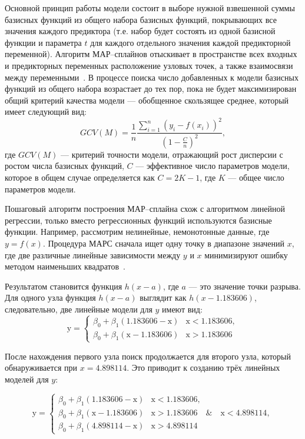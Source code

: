 Основной принцип работы модели состоит в выборе нужной взвешенной суммы базисных функций из общего набора базисных функций, покрывающих все значения каждого предиктора (т.е. набор будет состоять из одной базисной функции и параметра $t$ для каждого отдельного значения каждой предикторной переменной).
Алгоритм МАР--сплайнов отыскивает в пространстве всех входных и предикторных переменных расположение узловых точек, а также взаимосвязи между переменными~\cite{romanova}.
В процессе поиска число добавленных к модели базисных функций из общего набора возрастает до тех пор, пока не будет максимизирован общий критерий качества модели --- обобщенное скользящее среднее, который имеет следующий вид:
\begin{equation}
    GCV(M) = \frac{1}{n} \frac{\sum_{i=1}^{n} (y_i - f(x_i))^2}{(1 - \frac{C}{n})^2},
\end{equation}
где $GCV(M)$ --- критерий точности модели, отражающий рост дисперсии с ростом числа базисных функций, $C$ --- эффективное число параметров модели, которое в общем случае определяется как $C = 2K - 1$, где $K$ --- общее число параметров модели.

Пошаговый алгоритм построения МАР--сплайна схож с алгоритмом линейной регрессии, только вместо регрессионных функций используются базисные функции.
Например, рассмотрим нелинейные, немонотонные данные, где $y = f(x)$.
Процедура МАРС сначала ищет одну точку в диапазоне значений $x$, где две различные линейные зависимости между $y$ и $x$ минимизируют ошибку методом наименьших квадратов~\cite{gitbook}.

Результатом становится функция $h(x - a)$, где $a$ --- это значение точки разрыва.
Для одного узла функция $h(x - a)$ выглядит как $h(x - 1.183606)$, следовательно, две линейные модели для $y$ имеют вид:
\begin{equation}
    \text{y} =
    \begin{cases}
        \beta_0 + \beta_1(1.183606 - \text{x}) & \text{x} < 1.183606, \\
        \beta_0 + \beta_1(\text{x} - 1.183606) & \text{x} > 1.183606
    \end{cases}
\end{equation}

После нахождения первого узла поиск продолжается для второго узла, который обнаруживается при $x = 4.898114$.
Это приводит к созданию трёх линейных моделей для $y$:

\begin{equation}
    \text{y} =
    \begin{cases}
        \beta_0 + \beta_1(1.183606 - \text{x}) & \text{x} < 1.183606, \\
        \beta_0 + \beta_1(\text{x} - 1.183606) & \text{x} > 1.183606 \quad \& \quad \text{x} < 4.898114, \\
        \beta_0 + \beta_1(4.898114 - \text{x}) & \text{x} > 4.898114
    \end{cases}
\end{equation}

